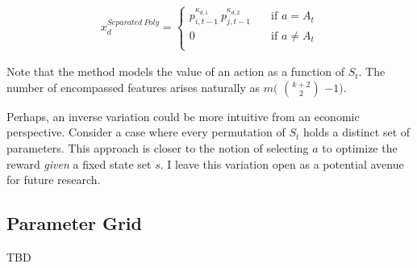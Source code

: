 \begin{gather}\label{separated_poly_extraction}
x_d^{Separated~Poly} = \begin{cases}
p_{i, t-1}^{\kappa_{d,1}} ~ p_{j, t-1}^{\kappa_{d,2}} & \quad \text{if } a = A_t  \\
0 & \quad \text{if } a \ne A_t \\ \end{cases} 
\end{gather}

Note that the method models the value of an action as a function of $S_t$. The number of encompassed features arises naturally as $m($ $k+2\choose2$ $-1)$.


Perhaps, an inverse variation could be more intuitive from an economic perspective. Consider a case where every permutation of $S_t$ holds a distinct set of parameters. This approach is closer to the notion of selecting $a$ to optimize the reward \emph{given} a fixed state set $s$. I leave this variation open as a potential avenue for future research.

\subsection{Parameter Grid}

TBD